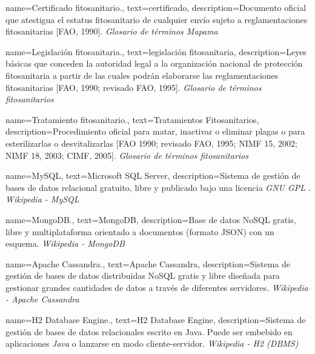 {
    name={Certificado fitosanitario.},
    text={certificado},
    description={Documento oficial que atestigua el estatus fitosanitario de cualquier envío sujeto a reglamentaciones fitosanitarias [FAO, 1990]. \textit{Glosario de términos Mapama} \cite{glosarioterminosmapama}}
}

{
    name={Legislación fitosanitaria.},
    text={legislación fitosanitaria},
    description={Leyes básicas que conceden la autoridad legal a la organización nacional de protección fitosanitaria a partir de las cuales podrán elaborarse las reglamentaciones fitosanitarias [FAO, 1990; revisado FAO, 1995]. \textit{Glosario de términos fitosanitarios} \cite{glosarioterminosfito}}
}

{
    name={Tratamiento fitosanitario.},
    text={Tratamientos Fitosanitarios},
    description={Procedimiento oficial para matar, inactivar o eliminar plagas o para esterilizarlas o desvitalizarlas [FAO 1990; revisado FAO, 1995; NIMF 15, 2002; NIMF 18, 2003; CIMF, 2005]. \textit{Glosario de términos fitosanitarios} \cite{glosarioterminosfito}}
}

{
    name={MySQL},
    text={Microsoft SQL Server},
    description={Sistema de gestión de bases de datos relacional gratuito, libre y publicado bajo una licencia \textit{GNU GPL} \cite{gnuglp}. \textit{Wikipedia - MySQL} \cite{wikimysql}}
}

{
    name={MongoDB.},
    text={MongoDB},
    description={Base de datos NoSQL gratis, libre y multiplataforma orientado a documentos (formato JSON) con un esquema. \textit{Wikipedia - MongoDB} \cite{wikimongodb}}
}

{
	name={Apache Cassandra.},
    text={Apache Cassandra},
    description={Sistema de gestión de bases de datos distribuidas NoSQL gratis y libre diseñada para gestionar grandes cantidades de datos a través de diferentes servidores. \textit{Wikipedia - Apache Cassandra} \cite{wikicassandra}}
}

{
    name={H2 Database Engine.},
    text={H2 Database Engine},
    description={Sistema de gestión de bases de datos relacionales escrito en Java. Puede ser embebido en aplicaciones \textit{Java} o lanzarse en modo cliente-servidor. \textit{Wikipedia - H2 (DBMS)} \cite{wikih2}}
}

